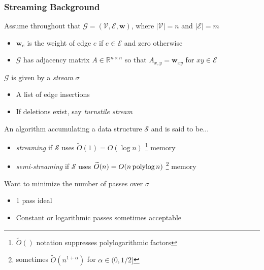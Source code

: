 \documentclass{beamer}
\newcommand{\polylog}{\, \textnormal{polylog} \,}
\begin{document}

\begin{frame}
\frametitle{Streaming Background}

Assume throughout that $\mathcal{G}=(\mathcal{V}, \mathcal{E}, \mathbf{w})$, where $|\mathcal{V}| = n$ and $|\mathcal{E}| = m$

\begin{itemize}
	\item $\mathbf{w}_e$ is the weight of edge $e$ if $e \in \mathcal{E}$ and zero otherwise
	\item $\mathcal{G}$ has adjacency matrix $A \in \mathbb{R}^{n \times n}$ so that $A_{x,y} = \textbf{w}_{xy}$ for $xy \in \mathcal{E}$
\end{itemize}

$\mathcal{G}$ is given by a \emph{stream} $\sigma$
\begin{itemize}
	\item A list of edge insertions
	\item If deletions exist, say \emph{turnstile stream}
\end{itemize}

An algorithm accumulating a data structure $\mathcal{S}$ and is said to be...
\begin{itemize}
	\item \emph{streaming} if $\mathcal{S}$ uses $\widetilde{O}(1) = O(\log n)$
	\footnote{\scriptsize $\widetilde{O}()$ notation suppresses polylogarithmic factors} memory
	\item \emph{semi-streaming} if $\mathcal{S}$ uses $\widetilde{O}(n) = O(n \polylog n)$
	\footnote{\scriptsize sometimes $\widetilde{O} \left (n^{1+\alpha} \right )$ for $\alpha \in (0,1/2]$} memory
\end{itemize}

Want to minimize the number of passes over $\sigma$	
\begin{itemize}
	\item 1 pass ideal
	\item Constant or logarithmic passes sometimes acceptable 
\end{itemize}

\end{frame}

\end{document}
